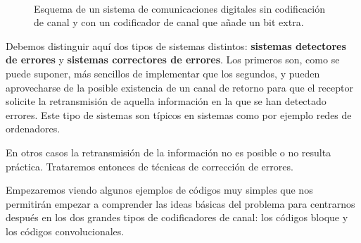 \documentclass[es,apuntes]{uah}
\begin{document}
\begin{figure}
	\centering
	\\
		\caption{Esquema de un sistema de comunicaciones digitales  sin codificación de canal y  con un codificador de canal que añade un bit extra. }	
		\label{fig:CodificacionDeCanal}
\end{figure}

Debemos distinguir aquí dos tipos de sistemas distintos: {\bf sistemas detectores de errores} y {\bf sistemas correctores de errores}. Los primeros son, como se puede suponer, más sencillos de implementar que los segundos, y pueden aprovecharse de la posible existencia de un canal de retorno para que el receptor solicite la retransmisión de aquella información en la que se han detectado errores. Este tipo de sistemas son típicos en sistemas como por ejemplo redes de ordenadores. 

En otros casos la retransmisión de la información no es posible o no resulta práctica. Trataremos entonces de técnicas de corrección de errores. 

Empezaremos viendo algunos ejemplos de códigos muy simples que nos permitirán empezar a comprender las ideas básicas del problema para centrarnos después en los dos grandes tipos de codificadores de canal: los códigos bloque y los códigos convolucionales. 


\end{document}
